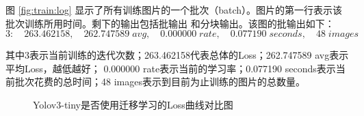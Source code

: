 图 \ref{fig:train:log} 显示了所有训练图片的一个批次（batch）。图片的第一行表示该批次训练所用时间。剩下的输出包括批输出
和分块输出。该图的批输出如下：
$$3: \quad 263.462158,\quad 262.747589 \; avg,\quad  0.000000 \; rate, \quad 0.077190 \; seconds, \quad 48 \; images$$

其中3表示当前训练的迭代次数；263.462158代表总体的Loss；262.747589 avg表示平均Loss，越低越好；
0.000000 rate表示当前的学习率；0.077190 seconds表示当前批次花费的总时间；48 images表示到目前为止训练的图片的总数量。

\begin{figure}[h]
    \centering
    \caption{Yolov3-tiny是否使用迁移学习的Loss曲线对比图}
    \label{fig:Loss_TL}
\end{figure}


